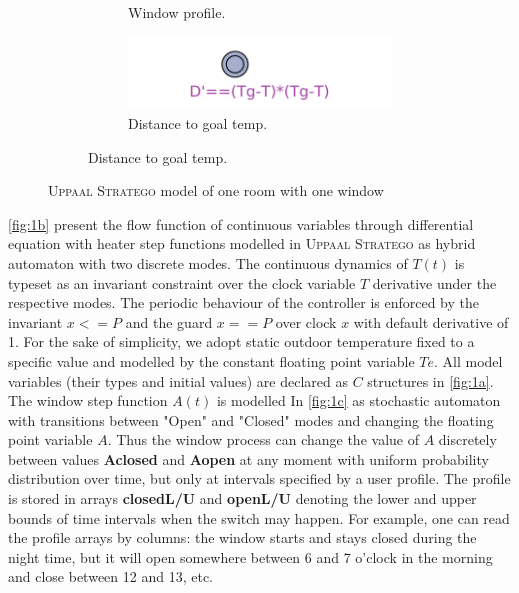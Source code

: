 \begin{figure}[!htb]
\begin{subfigure}{0.35\textwidth}
\begin{subfigure}{\textwidth}
            \caption{Window profile.} \label{fig:1c}
          \end{subfigure}
          \begin{subfigure}{\textwidth}
            \includegraphics[width=\linewidth]{images/distancetogoal.png}
            \caption{Distance to goal temp.} \label{fig:1d}
          \end{subfigure}     

      \end{subfigure}
      
      \caption{\textsc{Uppaal Stratego} model of one room with one window}
    \end{figure}

    \autoref{fig:1b} present the flow function of continuous variables through
     differential equation with heater step functions 
    modelled in \textsc{Uppaal Stratego} as hybrid automaton with two discrete 
    modes. The continuous dynamics of $T(t)$ is typeset as an invariant constraint over the 
    clock variable $T$ derivative under the respective modes. The periodic 
    behaviour of the controller is enforced by the invariant $x<=P$ and the
     guard $x==P$ over clock $x$ with default derivative of 1. For the 
     sake of simplicity,
    we adopt static outdoor temperature fixed to a specific value and 
    modelled by the constant floating point variable $Te$. All model
    variables (their types and initial values) are declared as $C$ structures
    in \autoref{fig:1a}. The window step function $A(t)$ is modelled In
    \autoref{fig:1c} as stochastic automaton with transitions between "Open"
    and "Closed" modes and changing the floating point variable $A$. Thus
    the window process can change the value of $A$ discretely between values
    \textbf{Aclosed} and \textbf{Aopen} at any moment with uniform probability 
    distribution over time, but only at intervals specified by a user 
    profile. The profile is stored in arrays \textbf{closedL/U} and \textbf{openL/U}
    denoting the lower and upper bounds of time intervals when the switch 
    may happen. For example, one can read the profile arrays by columns:
    the window starts and stays closed during the night time, but it will 
    open somewhere between 6 and 7 o'clock in the morning and close between
    12 and 13, etc. 

